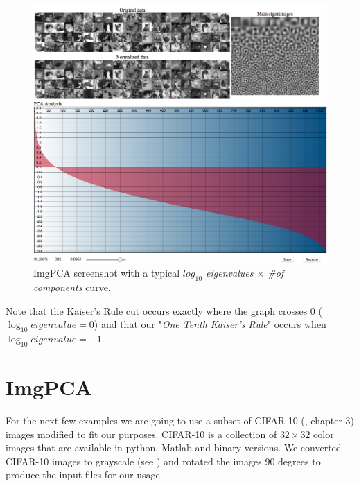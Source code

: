 \documentclass{article} %
\begin{document}
\begin{figure}[h]
\begin{center}
\includegraphics[width=\textwidth]{imgPca.png}
\end{center}
\caption{ImgPCA screenshot with a typical \emph{$log_{10}$ eigenvalues $\times$ \#of components} curve.}
\end{figure}
Note that the Kaiser's Rule cut occurs exactly where the graph crosses $0$ ($\log_{10} eigenvalue = 0$) and that our "\emph{One Tenth Kaiser's Rule}" occurs when $\log_{10} eigenvalue = -1$.
\section{ImgPCA}

For the next few examples we are going to use a subset of CIFAR-10 (\citet{krizhevsky2009learning}, chapter 3) images modified to fit our purposes. CIFAR-10 is a collection of $32\times 32$ color images that are available in python, Matlab and binary versions. We converted CIFAR-10 images to grayscale (see ) and rotated the images $90$ degrees to produce the input files for our usage.\par
\end{document}
